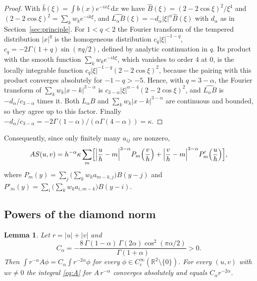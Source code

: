 \documentclass[11pt]{amsart}
\newtheorem{lemma}[equation]{Lemma}
\theoremstyle{definition}
\theoremstyle{remark}
\numberwithin{equation}{section}
\newcommand{\R}{\mathbb{R}}
\newcommand{\dd}{\,\mathrm{d}}
\newcommand{\Cc}{C_c^\infty}
\begin{document}
\begin{proof}
With $\hat b(\xi)=\int b(x)e^{-ix\xi}\dd x$ we have $\hat B(\xi)=(2-2\cos\xi)^2/\xi^4$ and $(2-2\cos\xi)^2=\sum_kw_ke^{-ik\xi}$, and $\widehat{L_\alpha B}(\xi)=-d_\alpha|\xi|^\alpha\hat B(\xi)$ with $d_\alpha$ as in Section~\ref{sec:principle}. For $1<q<2$ the Fourier transform of the tempered distribution $|x|^q$ is the homogeneous distribution $c_q|\xi|^{-1-q}$, $c_q=-2\Gamma(1+q)\sin(\pi q/2)$, defined by analytic continuation in $q$. Its product with the smooth function $\sum_kw_ke^{-ik\xi}$, which vanishes to order $4$ at $0$, is the locally integrable function $c_q|\xi|^{-1-q}(2-2\cos\xi)^2$, because the pairing with this product converges absolutely for $-1-q>-5$. Hence, with $q=3-\alpha$, the Fourier transform of $\sum_kw_k|x-k|^{3-\alpha}$ is $c_{3-\alpha}|\xi|^{\alpha-4}(2-2\cos\xi)^2$, and $\widehat{L_\alpha B}$ is $-d_\alpha/c_{3-\alpha}$ times it. Both $L_\alpha B$ and $\sum_kw_k|x-k|^{3-\alpha}$ are continuous and bounded, so they agree up to this factor. Finally $-d_\alpha/c_{3-\alpha}=-2\Gamma(1-\alpha)/(\alpha\Gamma(4-\alpha))=\kappa$.
\end{proof}

Consequently, since only finitely many $a_{ij}$ are nonzero,
\begin{equation}\label{eq:AS}
AS(u,v)=h^{-\alpha}\kappa\sum_m\Bigl[\Bigl|\frac uh-m\Bigr|^{3-\alpha}P_m\Bigl(\frac vh\Bigr)+\Bigl|\frac vh-m\Bigr|^{3-\alpha}P'_m\Bigl(\frac uh\Bigr)\Bigr],
\end{equation}
where $P_m(y)=\sum_j\bigl(\sum_kw_ka_{m-k,j}\bigr)B(y-j)$ and $P'_m(y)=\sum_i\bigl(\sum_kw_ka_{i,m-k}\bigr)B(y-i)$.

\subsection{Powers of the diamond norm}

\begin{lemma}\label{lem:power}
Let $r=|u|+|v|$ and
\[
C_\alpha=-\frac{8\,\Gamma(1-\alpha)\,\Gamma(2\alpha)\cos^2(\pi\alpha/2)}{\Gamma(1+\alpha)}>0 .
\]
Then $\int r^{-\alpha}A\phi=C_\alpha\int r^{-2\alpha}\phi$ for every $\phi\in\Cc(\R^2\setminus\{0\})$. For every $(u,v)$ with $uv\ne0$ the integral \eqref{eq:A} for $A\,r^{-\alpha}$ converges absolutely and equals $C_\alpha r^{-2\alpha}$.
\end{lemma}
\end{document}
